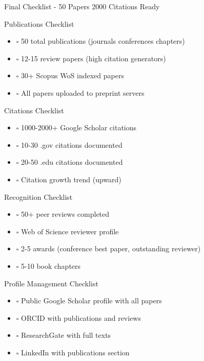 \documentclass[11pt]{beamer}
\begin{document}
	\begin{frame}{Final Checklist - 50 Papers   2000 Citations Ready}
		\scriptsize
		\begin{block}{Publications Checklist}
			\begin{itemize}
				\item $\square$ 50 total publications (journals  conferences chapters)
				\item $\square$ 12-15 review papers (high citation generators)
				\item $\square$ 30+ Scopus WoS indexed papers
				\item $\square$ All papers uploaded to preprint servers
			\end{itemize}
		\end{block}
		\begin{block}{Citations Checklist}
			\begin{itemize}
				\item $\square$ 1000-2000+ Google Scholar citations
				\item $\square$ 10-30 .gov citations documented
				\item $\square$ 20-50 .edu citations documented
				\item $\square$ Citation growth trend (upward)
			\end{itemize}
		\end{block}
		\begin{block}{Recognition Checklist}
			\begin{itemize}
				\item $\square$ 50+ peer reviews completed
				\item $\square$ Web of Science reviewer profile
				\item $\square$ 2-5 awards (conference best paper, outstanding reviewer)
				\item $\square$ 5-10 book chapters
			\end{itemize}
		\end{block}
		\begin{block}{Profile Management Checklist}
			\begin{itemize}
				\item $\square$ Public Google Scholar profile with all papers
				\item $\square$ ORCID with publications and reviews
				\item $\square$ ResearchGate with full texts
				\item $\square$ LinkedIn with publications section
			\end{itemize}
		\end{block}
	\end{frame}
	
\end{document}

